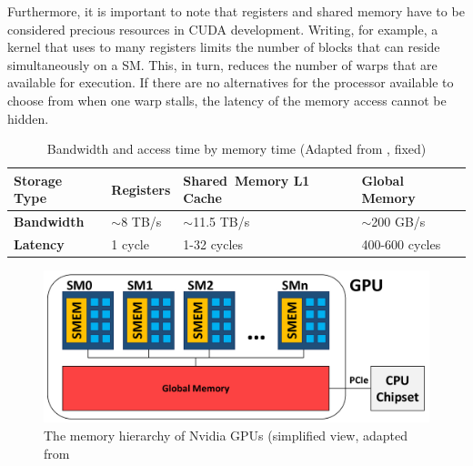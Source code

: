 Furthermore, it is important to note that registers and shared memory have to be considered precious resources in CUDA development. Writing, for example, a kernel that uses to many registers limits the number of blocks that can reside simultaneously on a SM. This, in turn, reduces the number of warps that are available for execution. If there are no alternatives for the processor available to choose from when one warp stalls, the latency of the memory access cannot be hidden. 

\begin{table}
\centering
\begin{tabular}{|l|l|p{2.8cm}|l|}
\hline
 \textbf{Storage Type} & Registers & \mbox{Shared Memory} L1 Cache & Global Memory \\ \hline
 \textbf{Bandwidth} & $\sim$8 TB/s & $\sim$11.5 TB/s & $\sim$200 GB/s\\ \hline
 \textbf{Latency} & 1 cycle & 1-32 cycles & 400-600 cycles \\ \hline
\end{tabular}
\caption{Bandwidth and access time by memory time (Adapted from \cite {cook_cuda_2012}, fixed)}
\label{tab:bwandaccess}
\end{table}

\begin{figure}
\centering
\includegraphics[width=\textwidth]{images/gpuarchitecture.pdf}%
\caption{The memory hierarchy of Nvidia GPUs (simplified view, adapted from \cite{nvidia_cuda_2012}}
\label{fig:memoryhier}
\end{figure}

